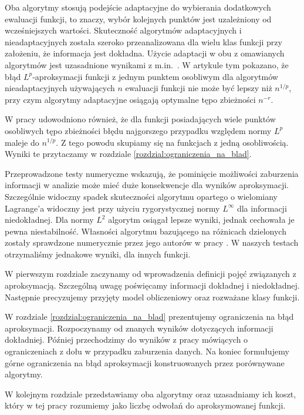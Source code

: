 \documentclass[oik, pdftex, man]{mgrwms}
\begin{document}
\begin{wstep}[Wprowadzenie]
    Oba algorytmy stosują podejście adaptacyjne do wybierania dodatkowych ewaluacji funkcji, to znaczy, wybór kolejnych punktów jest uzależniony od wcześniejszych wartości. Skuteczność algorytmów adaptacyjnych i nieadaptacyjnych została szeroko przeanalizowana dla wielu klas funkcji przy założeniu, że informacja jest dokładna. Użycie adaptacji w obu z omawianych algorytmów jest uzasadnione wynikami z m.in.~\cite{PoA}. W artykule tym pokazano, że błąd $L^{p}$-aproksymacji funkcji z jednym punktem osobliwym dla algorytmów nieadaptacyjnych używających $n$ ewaluacji funkcji nie może być lepszy niż $n^{1/p}$, przy czym algorytmy adaptacyjne osiągają optymalne tępo zbieżności $n^{-r}$.

    W pracy \cite{PoA} udowodniono również, że dla funkcji posiadających wiele punktów osobliwych tępo zbieżności błędu najgorszego przypadku względem normy $L^{p}$ maleje do $n^{1/p}$. Z tego powodu skupiamy się na funkcjach z jedną osobliwością. Wyniki te przytaczamy w rozdziale \ref{rozdzial:ograniczenia_na_blad}.

    Przeprowadzone testy numeryczne wskazują, że pominięcie możliwości zaburzenia informacji w analizie może mieć duże konsekwencje dla wyników aproksymacji. Szczególnie widoczny spadek skuteczności algorytmu opartego o wielomiany Lagrange'a widoczny jest przy użyciu rygorystycznej normy $L^{\infty}$ dla informacji niedokładnej. Dla normy $L^{2}$ algorytm osiągał lepsze wyniki, jednak cechowała je pewna niestabilność. Własności algorytmu bazującego na różnicach dzielonych zostały sprawdzone numerycznie przez jego autorów w pracy \cite{AoP}. W naszych testach otrzymaliśmy jednakowe wyniki, dla innych funkcji.

    W pierwszym rozdziale zaczynamy od wprowadzenia definicji pojęć związanych z aproksymacją. Szczególną uwagę poświęcamy informacji dokładnej i niedokładnej. Następnie precyzujemy przyjęty model obliczeniowy oraz rozważane klasy funkcji.

    W rozdziale \ref{rozdzial:ograniczenia_na_blad} prezentujemy ograniczenia na błąd aproksymacji. Rozpoczynamy od znanych wyników dotyczących informacji dokładniej. Później przechodzimy do wyników z pracy \cite{AoP} mówiących o ograniczeniach z dołu w przypadku zaburzenia danych. Na koniec formułujemy górne ograniczenia na błąd aproksymacji konstruowanych przez porównywane algorytmy.

    W kolejnym rozdziale przedstawiamy oba algorytmy oraz uzasadniamy ich koszt, który w tej pracy rozumiemy jako liczbę odwołań do aproksymowanej funkcji.


\end{wstep}
\end{document}
